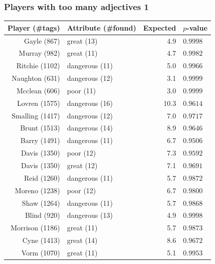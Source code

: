 \documentclass{beamer}
\begin{document}
\begin{frame}
\frametitle{Players with too many adjectives 1}
\scriptsize
\begin{tabular}{r l r l}
Player (\#tags) & Attribute (\#found) & Expected & $p$-value\\\hline
Gayle (867) &great (13) & 4.9 & $0.9998$\\
Murray (982) &great (11) & 4.7 & $0.9982$\\
Ritchie (1102) &dangerous (11) & 5.0 & $0.9966$\\
{\color{gray}Naughton (631)} &{\color{gray}dangerous (12)} & {\color{gray}3.1} & {\color{gray}$0.9999$}\\
{\color{gray}Mcclean (606)} &{\color{gray}poor (11)} & {\color{gray}3.0} & {\color{gray}$0.9999$}\\
Lovren (1575) &dangerous (16) & 10.3 & $0.9614$\\
Smalling (1417) &dangerous (12) & 7.0 & $0.9717$\\
Brunt (1513) &dangerous (14) & 8.9 & $0.9646$\\
Barry (1491) &dangerous (11) & 6.7 & $0.9506$\\
Davis (1350) &poor (12) & 7.3 & $0.9592$\\
Davis (1350) &great (12) & 7.1 & $0.9691$\\
Reid (1260) &dangerous (11) & 5.7 & $0.9872$\\
Moreno (1238) &poor (12) & 6.7 & $0.9800$\\
Shaw (1264) &dangerous (11) & 5.7 & $0.9868$\\
Blind (920) &dangerous (13) & 4.9 & $0.9998$\\
Morrison (1186) &great (11) & 5.7 & $0.9873$\\
Cyne (1413) &great (14) & 8.6 & $0.9672$\\
Vorm (1070) &great (11) & 5.1 & $0.9953$\\\hline
\end{tabular}
\end{frame}
\end{document}
